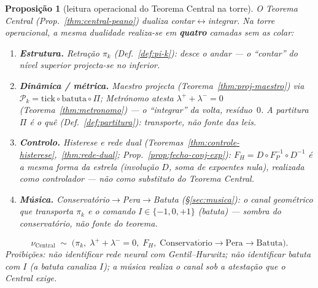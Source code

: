 \documentclass[11pt,a4paper]{article}
\newtheorem{proposicao}{Proposição}
\begin{document}
\begin{proposicao}[leitura operacional do Teorema Central na torre]\label{prop:central-operacional}
O Teorema Central (Prop.~\ref{thm:central-peano}) dualiza
contar$\leftrightarrow$integrar. Na torre operacional, a mesma
dualidade realiza-se em \textbf{quatro} camadas sem as colar:
\begin{enumerate}
\item \textbf{Estrutura.} Retração $\pi_k$ (Def.~\ref{def:pi-k}): desce
o andar --- o ``contar'' do nível superior projecta-se no inferior.
\item \textbf{Dinâmica / métrica.} Maestro projecta
(Teorema~\ref{thm:proj-maestro}) via
$\mathcal{P}_k=\mathrm{tick}\circ\mathrm{batuta}\circ\Pi$;
Metrónomo atesta $\lambda^{+}+\lambda^{-}=0$
(Teorema~\ref{thm:metronomo}) --- o ``integrar'' da volta,
resíduo~$0$. A partitura $\Pi$ é o \emph{quê}
(Def.~\ref{def:partitura}): transporte, não fonte das leis.
\item \textbf{Controlo.} Histerese e rede dual
(Teoremas~\ref{thm:controle-histerese},~\ref{thm:rede-dual};
Prop.~\ref{prop:fecho-conj-exp}): $F_H=D\circ F_P^{-1}\circ D^{-1}$
é a \emph{mesma forma} da estrela (involução $D$, soma de expoentes
nula), realizada como controlador --- não como substituto do
Teorema Central.
\item \textbf{Música.} Conservatório$\to$Pera$\to$Batuta
(\S\ref{sec:musica}): o canal geométrico que transporta $\pi_k$ e o
comando $I\in\{-1,0,+1\}$ (batuta) --- sombra do conservatório, não
fonte do teorema.
\end{enumerate}
\[
\boxed{
\nu_{\mathrm{Central}}
\;\sim\;
\bigl(\pi_k,\;\lambda^{+}+\lambda^{-}=0,\;F_H,\;
\mathrm{Conservat\acute{o}rio}\!\to\!\mathrm{Pera}\!\to\!\mathrm{Batuta}\bigr).
}
\]
\emph{Proibições:} não identificar rede neural com Gentil--Hurwitz;
não identificar batuta com $I$ (a batuta \emph{canaliza} $I$);
a música \emph{realiza} o canal sob a atestação que o Central exige.
\end{proposicao}
\end{document}
